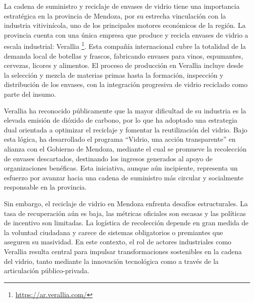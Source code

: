La cadena de suministro y reciclaje de envases de vidrio tiene una importancia estratégica en la provincia de Mendoza, por su estrecha vinculación con la industria vitivinícola, uno de los principales motores económicos de la región. La provincia cuenta con una única empresa que produce y recicla envases de vidrio a escala industrial: Verallia \footnote{\url{https://ar.verallia.com/}}. Esta compañía internacional cubre la totalidad de la demanda local de botellas y frascos, fabricando envases para vinos, espumantes, cervezas, licores y alimentos. El proceso de producción en Verallia incluye desde la selección y mezcla de materias primas hasta la formación, inspección y distribución de los envases, con la integración progresiva de vidrio reciclado como parte del insumo.

Verallia ha reconocido públicamente que la mayor dificultad de su industria es la elevada emisión de dióxido de carbono, por lo que ha adoptado una estrategia dual orientada a optimizar el reciclaje y fomentar la reutilización del vidrio. Bajo esta lógica, ha desarrollado el programa ``Vidrio, una acción transparente'' en alianza con el Gobierno de Mendoza, mediante el cual se promueve la recolección de envases descartados, destinando los ingresos generados al apoyo de organizaciones benéficas. Esta iniciativa, aunque aún incipiente, representa un esfuerzo por avanzar hacia una cadena de suministro más circular y socialmente responsable en la provincia.

Sin embargo, el reciclaje de vidrio en Mendoza enfrenta desafíos estructurales. La tasa de recuperación aún es baja, las métricas oficiales son escasas y las políticas de incentivo son limitadas. La logística de recolección depende en gran medida de la voluntad ciudadana y carece de sistemas obligatorios o premiantes que aseguren su masividad. En este contexto, el rol de actores industriales como Verallia resulta central para impulsar transformaciones sostenibles en la cadena del vidrio, tanto mediante la innovación tecnológica como a través de la articulación público-privada.

